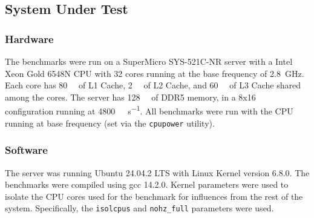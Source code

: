 \subsection{System Under Test}
\subsubsection{Hardware}
The benchmarks were run on a SuperMicro SYS-521C-NR server with a Intel Xeon Gold 6548N CPU with 32 cores
running at the base frequency of \SI{2.8}{\giga\hertz}.
Each core has \SI{80}{\kilo\byte} of L1 Cache, \SI{2}{\mega\byte} of L2 Cache, and \SI{60}{\mega\byte} of L3
Cache shared among the cores.
The server has \SI{128}{\giga\byte} of DDR5 memory, in a 8x\SI{16}{\giga\byte} configuration running at
\SI{4800}{\mega\transfer\per\second}.
All benchmarks were run with the CPU running at base frequency (set via the \texttt{cpupower} utility).

\subsubsection{Software}
The server was running Ubuntu 24.04.2 LTS with Linux Kernel version 6.8.0.
The benchmarks were compiled using gcc 14.2.0.
Kernel parameters were used to isolate the CPU cores used for the benchmark for influences from the rest of the system.
Specifically, the \texttt{isolcpus} and \texttt{nohz\_full} parameters were used.
